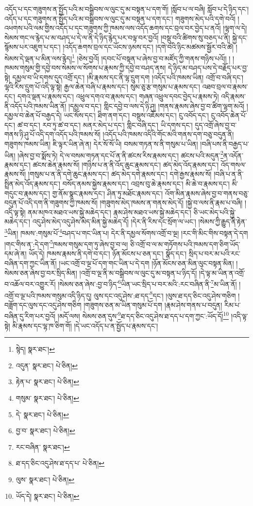 འདོད་པ་དང་གཟུགས་ན་སྤྱོད་པའི་མ་བསྒྲིབས་ལ་ལུང་དུ་མ་བསྟན་པ་དག་གོ། །སློབ་པ་ལ་བཞི། སློབ་པ་དེ་ཉིད་དང་། འདོད་པ་དང་གཟུགས་ན་སྤྱོད་པའི་མ་བསྒྲིབས་ལ་ལུང་དུ་མ་བསྟན་པ་དག་དང་། གཟུགས་མེད་པའི་དགེ་བའོ། །འཕགས་པའི་ལམ་གྱིས་འདོད་པ་དང་གཟུགས་ཀྱི་ཁམས་ལས་འདོད་ཆགས་དང་བྲལ་བར་བྱེད་པ་ནའོ། །ལྷག་ལ་དེ། སེམས་གང་ལ་རྙེད་པ་མ་བཤད་པ་དེ་ལ་ནི་དེ་ཉིད་རྙེད་པར་བལྟ་བར་བྱའོ། །བསྡུ་བའི་ཚིགས་སུ་བཅད་པ་ནི། སྐྱེ་དང་སྙོམས་པར་འཇུག་པ་དང་། །འདོད་ཆགས་བྲལ་དང་ཡོངས་ཉམས་དང་། །དགེ་བའི་ཉིང་མཚམས་སྦྱོར་བའི་ཚེ། །སེམས་དེ་ལྡན་པ་མིན་ལས་རྙེད།\footnote{སྙེད།  སྣར་ཐང་། } །ཅེས་བྱའོ། །དབང་པོ་བསྟན་པ་ཞེས་བྱ་བ་མཛོད་ཀྱི་གནས་གཉིས་པའོ།། །
།ཁམས་གསུམ་གྱི་དབྱེ་བས་སེམས་ལ་སོགས་པ་རྣམས་ཀྱི་དབྱེ་བ་བཤད་ནས། དེ་ཉིད་མ་བཤད་པས་དེ་བརྗོད་པར་བྱ་སྟེ། དམྱལ་བ་ཡི་དགས་དུད་འགྲོ་དང་། །མི་རྣམས་དང་ནི་ལྷ་དྲུག་དག །འདོད་པའི་ཁམས་ཡིན། འགྲོ་བ་བཞི་དང་། ལྷའི་རིས་དྲུག་པོ་འདི་ལྟ་སྟེ། རྒྱལ་ཆེན་བཞི་པ་རྣམས་དང་། སུམ་ཅུ་རྩ་གསུམ་པ་རྣམས་དང་། འཐབ་བྲལ་བ་རྣམས་དང་། དགའ་ལྡན་པ་རྣམས་དང་། འཕྲུལ་དགའ་བ་རྣམས་དང་། གཞན་འཕྲུལ་དབང་བྱེད་པ་རྣམས་ཏེ། འདི་རྣམས་ནི་འདོད་པའི་ཁམས་ཡིན་ནོ། །དམྱལ་བ་དང་། གླིང་དབྱེ་བ་ལས་དེ་ཉི་ཤུ། །གནས་རྣམས་ཞེས་བྱ་བ་ཚིག་ལྷག་མའོ། །དམྱལ་བ་ཆེན་པོ་བརྒྱད་དེ། ཡང་སོས་དང་། ཐིག་ནག་དང་། བསྡུས་འཇོམས་དང་། ངུ་འབོད་དང་། ངུ་འབོད་ཆེན་པོ་དང་། ཚ་བ་དང་། རབ་ཏུ་ཚ་བ་དང་། མནར་མེད་པ་དང་། གླིང་བཞི་དང་། ཡི་དགས་དང་། དུད་འགྲོ་ཞེས་བྱ་བ་གནས་ཉི་ཤུ་པོ་འདི་དག་འདོད་པའི་ཁམས་སོ། །འདོད་པའི་ཁམས་འདིའི་གོང་མའི་གནས་དག་བཅུ་བདུན་ནི། གཟུགས་ཁམས་ཡིན། ཇི་ལྟར་ཡིན་ཞེ་ན། དེར་སོ་སོ་ཡི། བསམ་གཏན་ས་ནི་གསུམ་པ་ཡིན། །བཞི་པས་ནི་བརྒྱད་པ་ཡིན། །ཞེས་བྱ་བ་སྨོས་ཏེ། དེ་ལ་བསམ་གཏན་དང་པོ་ན་ནི་ཚངས་རིས་རྣམས་དང་། ཚངས་པའི་མདུན་\footnote{འདུན་  སྣར་ཐང་།  པེ་ཅིན། }ན་འདོན་རྣམས་དང་། ཚངས་ཆེན་རྣམས་སོ། །གཉིས་པ་ན་ནི་འོད་ཆུང་རྣམས་དང་། ཚད་མེད་འོད་རྣམས་དང་། འོད་གསལ་རྣམས་སོ། །གསུམ་པ་ན་ནི་དགེ་ཆུང་རྣམས་དང་། ཚད་མེད་དགེ་རྣམས་དང་། དགེ་རྒྱས་རྣམས་སོ། །བཞི་པ་ན་ནི་སྤྲིན་མེད་འོད་རྣམས་དང་། བསོད་ནམས་སྐྱེས་རྣམས་དང་། འབྲས་བུ་ཆེ་རྣམས་དང་། མི་ཆེ་བ་རྣམས་དང་། མི་གདུང་བ་རྣམས་དང་། གྱ་ནོམ་སྣང་རྣམས་དང་། ཤིན་ཏུ་མཐོང་རྣམས་དང་། འོག་མིན་རྣམས་ཞེས་བྱ་བ་གནས་བཅུ་བདུན་པོ་འདི་དག་ནི་གཟུགས་ཀྱི་ཁམས་སོ། །གཟུགས་མེད་ཁམས་ན་གནས་མེད་དོ། །སྐྱེ་བ་ལས་ནི་རྣམ་པ་བཞི། །འདི་ལྟ་སྟེ། ནམ་མཁའ་མཐའ་ཡས་སྐྱེ་མཆེད་དང་། རྣམ་ཤེས་མཐའ་ཡས་སྐྱེ་མཆེད་དང་། ཅི་ཡང་མེད་པའི་སྐྱེ་མཆེད་དང་། འདུ་ཤེས་མེད་འདུ་ཤེས་མེད་མིན་སྐྱེ་མཆེད་དོ། །དེར་ནི་རིས་དང་སྲོག་ལ་ཡང་། །སེམས་ཀྱི་རྒྱུད་ནི་རྟེན་\footnote{རྟེན་པ་  སྣར་ཐང་།  པེ་ཅིན། }ཡིན། ཁམས་:གསུམ་པོ་\footnote{གསུམ་  སྣར་ཐང་།  པེ་ཅིན། }བཤད་པ་གང་ཡིན་པ། དེར་ནི་དམྱལ་སོགས་འགྲོ་བ་ལྔ། །རང་གི་མིང་གིས་བསྟན་དེ་དག །གང་གིས་ན་:དེ་དག་\footnote{དེ་  སྣར་ཐང་།  པེ་ཅིན། }ཁམས་གསུམ་དག་ཏུ་ཞེས་བྱ་བ་ལ། ཅི་འགྲོ་བ་ལ་མ་གཏོགས་པའི་ཁམས་དག་ཅིག་ཡོད་དམ་ཞེ་ན། ཡོད་དེ། ཁམས་རྣམས་ནི་དགེ་བ་དང་། ཉོན་མོངས་པ་ཅན་དང་། སྣོད་དང་། སྲིད་པ་བར་མ་པའི་རང་བཞིན་དག་ཀྱང་ཡིན་ནོ། །ཡང་འགྲོ་བ་ལྔ་པོ་དག་གང་ཡིན་པ་དེ་དག །ཉོན་མོངས་ཅན་མིན་ལུང་བསྟན་མིན། །སེམས་ཅན་ཞེས་བྱ་བར་སྲིད་མིན། །འགྲོ་བ་ལྔ་ནི་མ་བསྒྲིབས་ལ་ལུང་དུ་མ་བསྟན་པ་ཉིད་དོ། །དེ་ལྟ་མ་ཡིན་ན་འགྲོ་བ་འཆོལ་བར་འགྱུར་རོ། །སེམས་ཅན་ཞེས་:བྱ་བ་ཉིད་\footnote{བྱ་བ་  སྣར་ཐང་།  པེ་ཅིན། }ཡིན་ཡང་སྲིད་པ་བར་མའི་:རང་བཞིན་ནི་\footnote{རང་བཞིན་  སྣར་ཐང་། }མ་ཡིན་ནོ། །འགྲོ་བ་ལྔ་པའི་ཁམས་གསུམ་འདི་ཉིད་དུ། ལུས་དང་འདུ་ཤེས་:ཐ་དད་\footnote{ཐ་དད་ཅིང་འདུ་ཤེས་ཐ་དད་པ་  པེ་ཅིན། }དང་། །ལུས་ཐ་དད་ཅིང་འདུ་ཤེས་གཅིག །བཟློག་དང་ལུས་དང་འདུ་ཤེས་གཅིག །གཟུགས་ཅན་མ་ཡིན་གསུམ་པོ་དག །རྣམ་ཤེས་གནས་པ་བདུན། རིམ་པ་བཞིན་དུ་རིག་པར་བྱའོ། །མདོ་ལས། སེམས་ཅན་དུས་\footnote{ལུས་  སྣར་ཐང་།  པེ་ཅིན། }ཐ་དད་ཅིང་འདུ་ཤེས་ཐ་དད་པ་དག་ཀྱང་:ཡོད་དོ།\footnote{ཡོད་དེ།  སྣར་ཐང་།  པེ་ཅིན། } །འདི་ལྟ་སྟེ། མི་རྣམས་དང་ལྷ་ཁ་ཅིག་གོ། །དེ་ཡང་འདོད་པ་ན་སྤྱོད་པ་རྣམས་དང་། 